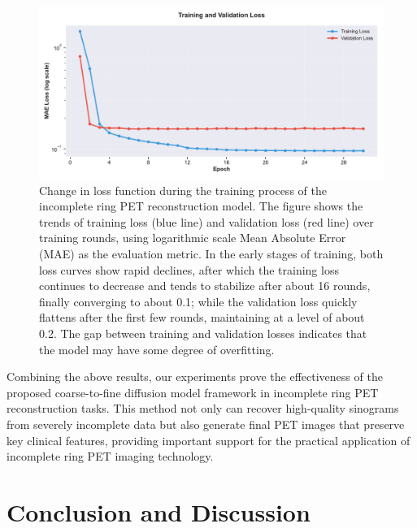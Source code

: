 \documentclass[
reprint,
superscriptaddress,
nofootinbib,
amsmath,amssymb,
aps,
prd,
]{revtex4-2}
\begin{document}
\begin{figure}[ht]
    \centering
    \includegraphics[width=\textwidth]{Images/loss_plot.pdf}
    \caption{Change in loss function during the training process of the incomplete ring PET reconstruction model. The figure shows the trends of training loss (blue line) and validation loss (red line) over training rounds, using logarithmic scale Mean Absolute Error (MAE) as the evaluation metric. In the early stages of training, both loss curves show rapid declines, after which the training loss continues to decrease and tends to stabilize after about 16 rounds, finally converging to about 0.1; while the validation loss quickly flattens after the first few rounds, maintaining at a level of about 0.2. The gap between training and validation losses indicates that the model may have some degree of overfitting.}
    \label{fig:training_validation_loss}
\end{figure}
Combining the above results, our experiments prove the effectiveness of the proposed coarse-to-fine diffusion model framework in incomplete ring PET reconstruction tasks. This method not only can recover high-quality sinograms from severely incomplete data but also generate final PET images that preserve key clinical features, providing important support for the practical application of incomplete ring PET imaging technology.


\section{Conclusion and Discussion}
\label{chap:conclusion}
\end{document}
